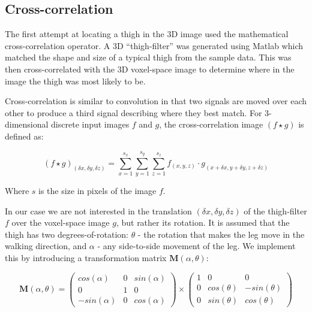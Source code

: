 \subsection{Cross-correlation}\label{sec:CC}

The first attempt at locating a thigh in the 3D image used the mathematical cross-correlation operator.
A 3D ``thigh-filter'' was generated using Matlab which matched the shape and size of a typical thigh from the sample data.
This was then cross-correlated with the 3D voxel-space image to determine where in the image the thigh was most likely to be.

\bigskip
\noindent Cross-correlation is similar to convolution in that two signals are moved over each other to produce a third signal describing where they best match.
For 3-dimensional discrete input images $f$ and $g$, the cross-correlation image $(f \star g)$ is defined as:

\begin{equation}
	(f \star g)_{(\delta x,\delta y,\delta z)} = \sum_{x=1}^{s_{x}} \sum_{y=1}^{s_{y}} \sum_{z=1}^{s_{z}} f_{(x,y,z)} \cdot g_{(x+\delta x,y+\delta y, z+\delta z)}
\end{equation}

Where $s$ is the size in pixels of the image $f$.

In our case we are not interested in the translation $(\delta x,\delta y,\delta z)$ of the thigh-filter $f$ over the voxel-space image $g$, but rather its rotation.
It is assumed that the thigh has two degrees-of-rotation: $\theta$ - the rotation that makes the leg move in the walking direction, and $\alpha$ - any side-to-side movement of the leg.
We implement this by introducing a transformation matrix $\mathbf{M}(\alpha,\theta)$:

\begin{equation}
	\mathbf{M}(\alpha,\theta) =
	\left(\begin{array}{ccc}
		cos(\alpha) & 0 & sin(\alpha) \\
		0 & 1 & 0 \\
		-sin(\alpha) & 0 & cos(\alpha)
	\end{array} \right)
	\times
	\left(\begin{array}{ccc}
		1 & 0 & 0 \\
		0 & cos(\theta) & -sin(\theta) \\
		0 & sin(\theta) & cos(\theta)
	\end{array} \right)
	\label{eqn:Matrix}
\end{equation}

